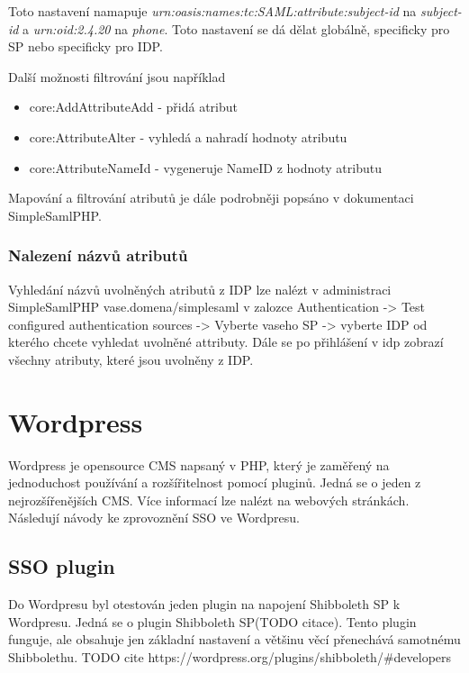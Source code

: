 Toto nastavení namapuje \emph{urn:oasis:names:tc:SAML:attribute:subject-id} na \emph{subject-id} a \emph{urn:oid:2.4.20} na \emph{phone}. Toto nastavení se dá dělat globálně, specificky pro SP nebo specificky pro IDP.

Další možnosti filtrování jsou například
\begin{itemize}
    \item core:AddAttributeAdd - přidá atribut
    \item core:AttributeAlter - vyhledá a nahradí hodnoty atributu
    \item core:AttributeNameId - vygeneruje NameID z hodnoty atributu
\end{itemize}

Mapování a filtrování atributů je dále podrobněji popsáno v dokumentaci SimpleSamlPHP. %


\subsubsection{Nalezení názvů atributů} %
Vyhledání názvů uvolněných atributů z IDP lze nalézt v administraci SimpleSamlPHP vase.domena/simplesaml v zalozce Authentication -> Test configured authentication sources -> Vyberte vaseho SP -> vyberte IDP od kterého chcete vyhledat uvolněné attributy. Dále se po přihlášení v idp zobrazí všechny atributy, které jsou uvolněny z IDP.


\section{Wordpress} %

Wordpress je opensource CMS napsaný v PHP, který je zaměřený na jednoduchost používání a rozšířitelnost pomocí pluginů. Jedná se o jeden z nejrozšířenějších CMS. Více informací lze nalézt na webových stránkách\cite{TODO-CITE}.
\\
Následují návody ke zprovoznění SSO ve Wordpresu.

\subsection{SSO plugin} %
Do Wordpresu byl otestován jeden plugin na napojení Shibboleth SP k Wordpresu. Jedná se o plugin Shibboleth SP\cite{ShibbolethSP}(TODO citace). Tento plugin funguje, ale obsahuje jen základní nastavení a většinu věcí přenechává samotnému Shibbolethu. TODO cite https://wordpress.org/plugins/shibboleth/#developers

